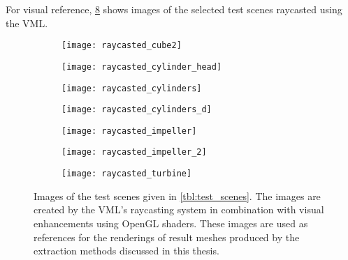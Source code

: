 For visual reference, \cref{fig:raycasted_scenes} shows images of the selected test scenes raycasted using the VML.
%
\begin{figure}[!]
	\centering
	\begin{subfigure}[b]{0.43\textwidth}
		\centering
		\texttt{[image: raycasted\_cube2]}
		\caption{\cubes}
		\label{fig:cube2_raycasted}
	\end{subfigure}
	\begin{subfigure}[b]{0.43\textwidth}
		\centering
		\texttt{[image: raycasted\_cylinder\_head]}
		\caption{\cylinderhead}
		\label{fig:cylinder_head_raycasted}
	\end{subfigure}
	\begin{subfigure}[b]{0.43\textwidth}
		\centering
		\texttt{[image: raycasted\_cylinders]}
		\caption{\cylinders}
		\label{fig:cylinders_raycasted}
	\end{subfigure}
	\begin{subfigure}[b]{0.43\textwidth}
		\centering
		\texttt{[image: raycasted\_cylinders\_d]}
		\caption{\cylindersd}
		\label{fig:cylinders_d_raycasted}
	\end{subfigure}
	\begin{subfigure}[b]{0.43\textwidth}
		\centering
		\texttt{[image: raycasted\_impeller]}
		\caption{\impeller}
		\label{fig:impeller_raycasted}
	\end{subfigure}
	\begin{subfigure}[b]{0.43\textwidth}
		\centering
		\texttt{[image: raycasted\_impeller\_2]}
		\caption{\impellerhalf}
		\label{fig:impeller_2_raycasted}
	\end{subfigure}
	\begin{subfigure}[b]{0.43\textwidth}
		\centering
		\texttt{[image: raycasted\_turbine]}
		\caption{\turbine}
		\label{fig:turbine_raycasted}
	\end{subfigure}
	\caption{
		Images of the test scenes given in \cref{tbl:test_scenes}.
		The images are created by the VML's raycasting system in combination with visual enhancements using OpenGL shaders.
		These images are used as references for the renderings of result meshes produced by the extraction methods discussed in this thesis.
	}
	\label{fig:raycasted_scenes}
\end{figure}
